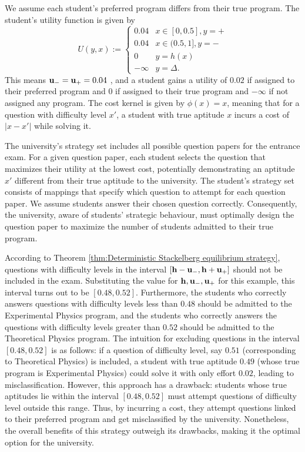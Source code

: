 \begin{exg}
We assume each student's preferred program differs from their true program. The student’s utility function is given by
\begin{equation}
	U(y,x) := \begin{cases}
		0.04 & x \in [0,0.5], y = \plus \\
		0.04 & x \in (0.5,1], y = \minus \\
		0 & y = h(x)\\
		-\infty & y = \Delta.
	\end{cases}
\end{equation}
This means $\mathbf{u_-} = \mathbf{u_+} = 0.04$ , and a student gains a utility of $0.02$ if assigned to their preferred program and $0$ if assigned to their true program and $-\infty$ if not assigned any program. The cost kernel is given by $\phi(x) = x$, meaning that for a question with difficulty level $x'$, a student with true aptitude $x$ incurs a cost of $|x - x'|$ while solving it.

The university's strategy set includes all possible question papers for the entrance exam. For a given question paper, each student selects the question that maximizes their utility at the lowest cost, potentially demonstrating an aptitude $x'$ different from their true aptitude to the university. The student’s strategy set consists of mappings that specify which question to attempt for each question paper. We assume students answer their chosen question correctly. Consequently, the university, aware of students' strategic behaviour, must optimally design the question paper to maximize the number of students admitted to their true program.

According to Theorem \ref{thm:Deterministic Stackelberg equilibrium strategy}, questions with difficulty levels in the interval $[\mathbf{h}- \mathbf{u_-},\mathbf{h}+\mathbf{u_+}]$ should not be included in the exam. Substituting the value for  $\mathbf{h},\mathbf{u_-},\mathbf{u_+}$ for this example, this interval turns out to be $[0.48,0.52]$. Furthermore, the students who correctly answers questions with difficulty levels less than $0.48$ should be admitted to the Experimental Physics program, and the students who correctly answers the questions with difficulty levels greater than $0.52$ should be admitted to the Theoretical Physics program. The intuition for excluding questions in the interval $[0.48,0.52]$ is as follows: if a question of difficulty level, say $0.51$ (corresponding to Theoretical Physics) is included, a student with true aptitude $0.49$ (whose true program is Experimental Physics) could solve it with only effort $0.02$, leading to misclassification. However, this approach has a drawback: students whose true aptitudes lie within the interval $[0.48,0.52]$ must attempt questions of difficulty level outside this range. Thus, by incurring a cost, they attempt questions linked to their preferred program and get misclassified by the university. Nonetheless, the overall benefits of this strategy outweigh its drawbacks, making it the optimal option for the university.




\end{exg}


